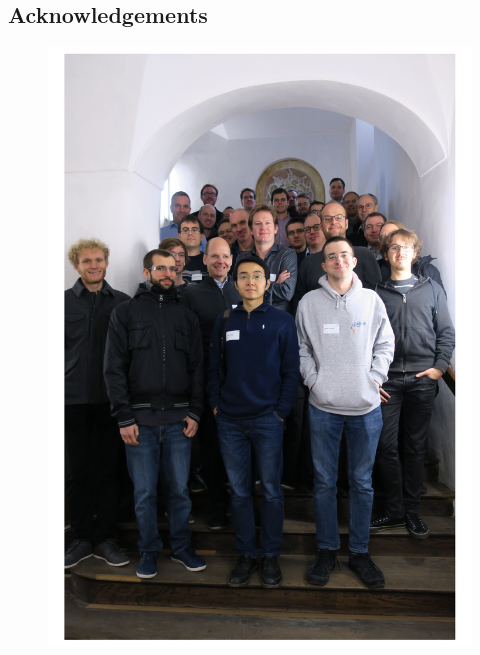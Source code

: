 
\subsection*{Acknowledgements}\label{sec:acknowledgement}

\begin{figure}[t!]
\includegraphics[width=\columnwidth]{figures/group-photo}
\end{figure}


